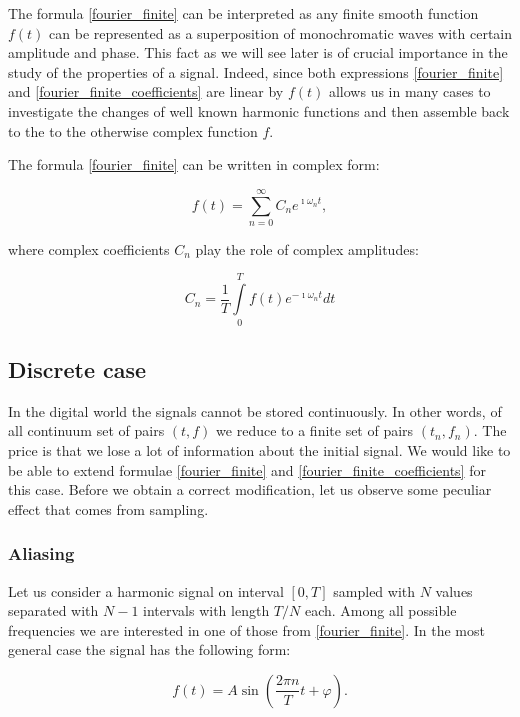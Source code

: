 \documentclass[11pt]{book}
\begin{document}
The formula \eqref{fourier_finite} can be interpreted as any finite smooth function $f(t)$ can be represented as a superposition of monochromatic waves with certain amplitude and phase. This fact as we will see later is of crucial importance in the study of the properties of a signal. Indeed, since both expressions \eqref{fourier_finite} and \eqref{fourier_finite_coefficients} are linear by $f(t)$ allows us in many cases to investigate the changes of well known harmonic functions and then assemble back to the to the otherwise complex function $f$.

The formula \eqref{fourier_finite} can be written in complex form:

\begin{equation}
f(t) = \sum\limits_{n=0}^\infty C_n e^{\imath \omega_n t},\label{fourier_finite_complex}
\end{equation}

where complex coefficients $C_n$ play the role of complex amplitudes:

\begin{equation}
C_n = \frac{1}{T} \int\limits_{0}^T f(t) e^{-\imath \omega_n t}dt
\end{equation}

\subsection{Discrete case}


In the digital world the signals cannot be stored continuously. In other words, of all continuum set of pairs $(t, f)$ we reduce to a finite set of pairs $(t_n, f_n)$. The price is that we lose a lot of information about the initial signal. We would like to be able to extend formulae  \eqref{fourier_finite} and \eqref{fourier_finite_coefficients} for this case. Before we obtain a correct modification, let us observe some peculiar effect that comes from sampling.

\subsubsection{Aliasing}

Let us consider a harmonic signal on interval $[0,T]$ sampled with $N$ values separated with $N-1$ intervals with length $T/N$ each. Among all possible frequencies we are interested in one of those from \eqref{fourier_finite}. In the most general case the signal has the following form:

\begin{equation}
f(t) = A \sin\left({\frac{2 \pi n}{T} t + \varphi}\right).
\end{equation}
\end{document}
